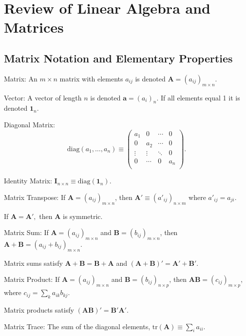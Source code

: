 \section{Review of Linear Algebra and Matrices}

\subsection{Matrix Notation and Elementary Properties}

\bdefi
Matrix: An $m\times n$ matrix with elements $a_{ij}$ is denoted
$\mathbf{A}=(a_{ij})_{m\times n}$.
\esdefi

\bsdefi 
Vector: A vector of length $n$ is denoted $\mathbf a =(a_i)_n$.  If
all elements equal 1 it is denoted $\mathbf 1_n$.  
\esdefi

\vb

\bsdefi 
Diagonal Matrix:
$$\mathrm{diag}(a_1,\ldots,a_n) \equiv
\left( \begin{array}{cccc}
a_1 & 0 & \cdots & 0 \\ 
0 & a_2 & \cdots & 0 \\ 
\vdots & \vdots & \ddots & 0 \\ 
0 & \cdots & 0 & a_n \\ 
\end{array} \right).$$ 
\esdefi 

\bsdefi 
Identity Matrix: $\mathbf{I}_{n\times n} \equiv
\mathrm{diag}(\mathbf{1}_n)$.
\esdefi

\bsdefi 
Matrix Transpose: If $\mathbf{A}=(a_{ij})_{m\times n}$, then $\mathbf
A'\equiv(a'_{ij})_{n\times m}$ where $a'_{ij}=a_{ji}$.
\esdefi

\bsdefi 
If $\mathbf{A=A'},$ then $\mathbf A$ is symmetric.
\esdefi 

\bdefi 
Matrix Sum: If $\mathbf{A}=(a_{ij})_{m\times n}$ and $\mathbf{B} =
(b_{ij})_{m\times n}$, then $\mathbf{A + B} = (a_{ij} +
b_{ij})_{m\times n}.$
\esdefi 

\bstheo
Matrix sums satisfy $\mathbf{A + B = B + A}$ and $\mathbf{(A + B)' = A' + B'}.$
\estheo

\bdefi 
Matrix Product: If $\mathbf{A} = (a_{ij})_{m\times n}$ and $\mathbf{B}
= (b_{ij})_{n\times p}$, then $\mathbf{AB} = (c_{ij})_{m\times p}$,
where $c_{ij}=\sum_k a_{ik}b_{kj}.$
\esdefi

\bstheo
Matrix products satisfy $\mathbf{(AB)'=B'A'}.$
\estheo 

\bdefi 
Matrix Trace: The sum of the diagonal elements, $\mathrm{tr}(\mathbf
A)\equiv\sum_i a_{ii}.$
\esdefi

